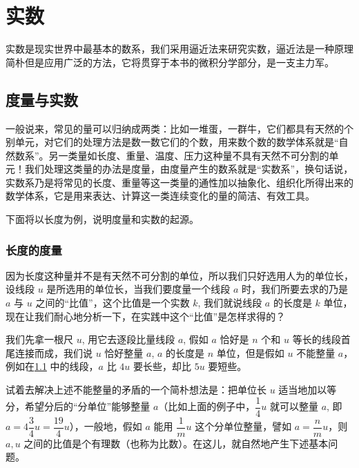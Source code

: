 \chapter{实数}\label{chp:real}
实数是现实世界中最基本的数系，我们采用逼近法来研究实数，逼近法是一种原理简朴但是应用广泛的方法，它将贯穿于本书的微积分学部分，是一支主力军。

\section{度量与实数}

一般说来，常见的量可以归纳成两类：比如一堆蛋，一群牛，它们都具有天然的个别单元，对它们的处理方法是数一数它们的个数，用来数个数的数学体系就是“自然数系”。另一类量如长度、重量、温度、压力这种量不具有天然不可分割的单元！我们处理这类量的办法是度量，由度量产生的数系就是“实数系”，换句话说，实数系乃是将常见的长度、重量等这一类量的通性加以抽象化、组织化所得出来的数学体系，它是用来表达、计算这一类连续变化的量的简洁、有效工具。

下面将以长度为例，说明度量和实数的起源。

\subsection{长度的度量}
因为长度这种量并不是有天然不可分割的单位，所以我们只好选用人为的单位长，设线段 $u$ 是所选用的单位长，当我们要度量一个线段 $a$ 时，我们所要去求的乃是 $a$ 与 $u$ 之间的“比值”，这个比值是一个实数 $k$, 我们就说线段 $a$ 的长度是 $k$ 单位，现在让我们耐心地分析一下，在实践中这个“比值”是怎样求得的？

我们先拿一根尺 $u$, 用它去逐段比量线段 $a$, 假如 $a$ 恰好是 $n$ 个和 $u$ 等长的线段首尾连接而成，我们说 $u$ 恰好整量 $a$, $a$ 的长度是 $n$ 单位，但是假如 $u$  不能整量 $a$，例如在\cref{fig:segments} 中的线段，$a$ 比 $4u$ 要长些，却比 $5u$ 要短些。

\begin{figure}
    \caption{}\label{fig:segments}
\end{figure}

{
\linespread{1.6}\selectfont
试着去解决上述不能整量的矛盾的一个简朴想法是：把单位长 $u$ 适当地加以等分，希望分后的“分单位”能够整量 $a$（比如上面的例子中，$\dfrac{1}{4}u$ 就可以整量 $a$, 即 $a=4\dfrac{3}{4}u=\dfrac{19}{4}u$），一般地，假如 $a$ 能用 $\dfrac{1}{m}u$ 这个分单位整量，譬如 $a=\dfrac{n}{m}u$，则 $a,u$ 之间的比值是个有理数（也称为比数）。在这儿，就自然地产生下述基本问题。\par}

